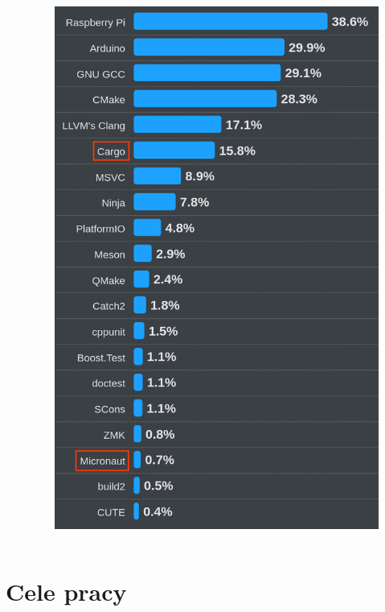 \documentclass{beamer}
\begin{document}
\begin{frame}
\begin{columns}
\begin{column}{.60\textwidth}
		\end{column}
		\begin{column}{.40\textwidth}
			\begin{figure}
				\includegraphics[height=0.7\textheight]{img/so-survey.png}
				\centering
				\caption{ \cite{so-survey}}
			\end{figure}
		\end{column}
	\end{columns}
\end{frame}

\section{Cele pracy}
\end{document}
